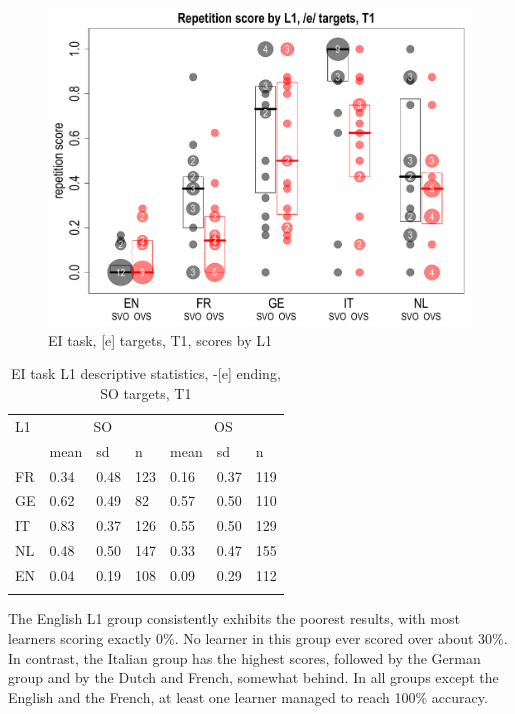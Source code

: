\begin{figure}
    \includegraphics[width=\textwidth]{figures/04-1.pdf}
    \caption{EI task, [e] targets, T1, scores by L1}
    \label{fig:04:1}
\end{figure}

\begin{table}
    \begin{tabularx}{\textwidth}{XXXXXXX}
    \lsptoprule
    L1 & \multicolumn{3}{c}{ SO} & \multicolumn{3}{c}{ OS}\\
    & mean & sd & n & mean & sd & n\\
    \cmidrule{2-7}
    FR & 0.34 & 0.48 & 123 & 0.16 & 0.37 & 119\\
    GE & 0.62 & 0.49 & 82 & 0.57 & 0.50 & 110\\
    IT & 0.83 & 0.37 & 126 & 0.55 & 0.50 & 129\\
    NL & 0.48 & 0.50 & 147 & 0.33 & 0.47 & 155\\
    EN & 0.04 & 0.19 & 108 & 0.09 & 0.29 & 112\\
    \lspbottomrule
    \end{tabularx}
    \caption{EI task L1 descriptive statistics, -[e] ending, SO targets, T1}
    \label{tab:04:1}
\end{table}

The English L1 group consistently exhibits the poorest results, with most learners scoring exactly 0\%. No learner in this group ever scored over about 30\%. In contrast, the Italian group has the highest scores, followed by the German group and by the Dutch and French, somewhat behind. In all groups except the English and the French, at least one learner managed to reach 100\% accuracy. 

